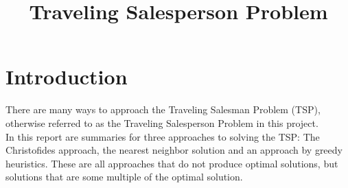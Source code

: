 \documentclass{article}
\title{Traveling Salesperson Problem}
\begin{document}
  \maketitle
  \section{Introduction}
  There are many ways to approach the Traveling Salesman Problem (TSP), otherwise referred to as the Traveling Salesperson Problem in this project.\\

  In this report are summaries for three approaches to solving the TSP: The Christofides approach, the nearest neighbor solution and an approach by greedy heuristics. These are all approaches that do not produce optimal solutions, but solutions that are some multiple of the optimal solution.




  {}
  
\end{document}
